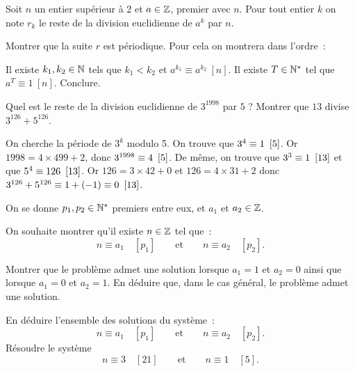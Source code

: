 \documentclass{magnolia}
\begin{document}
Soit $n$ un entier supérieur à 2 et $a\in\mathbb{Z}$, premier avec $n$. Pour tout
entier $k$ on note $r_k$ le reste de la division euclidienne de $a^k$ par $n$.
\begin{questions}
\question Montrer que la suite $r$ est périodique. Pour cela on montrera dans
  l'ordre~:
  \begin{questions}
  \question Il existe $k_1,k_2\in\mathbb{N}$ tels que $k_1<k_2$ et $a^{k_1}\equiv a^{k_2}\ [n]$.
  \question Il existe $T\in{\mathbb{N}^*}$ tel que $a^T\equiv 1\ [n]$.
  \question Conclure.
  \end{questions}
\question Quel est le reste de la division euclidienne de $3^{1998}$ par $5$ ?
\question Montrer que $13$ divise $3^{126}+5^{126}$.
\end{questions}
\begin{sol}
\begin{questions}
\question
\question On cherche la période de $3^k$ modulo 5. On trouve que $3^4\equiv 1\ \cro{5}$. Or $1998=4\times 499+2$, donc $3^{1998}\equiv 4\ \left[5\right]$.
\question De même, on trouve que $3^3\equiv 1\ \cro{13}$ et que $5^4\equiv 126\ \cro{13}$. Or $126=3\times 42+0$ et $126=4\times 31+2$ donc
  $3^{126}+5^{126}\equiv 1+(-1)\equiv 0\ \cro{13}$.
\end{questions}
\end{sol}

On se donne $p_1, p_2\in{\mathbb{N}^*}$ premiers entre eux, et $a_1$ et $a_2\in\mathbb{Z}$. 
\begin{questions}
\question On souhaite montrer qu'il existe $n\in\mathbb{Z}$ tel que~:
  \[n\equiv a_1 \quad [p_1] \qquad \text{et} \qquad n\equiv a_2 \quad [p_2].\]
  \begin{questions}
  \question Montrer que le problème admet une solution lorsque $a_1=1$ et
    $a_2=0$ ainsi que lorsque $a_1=0$ et $a_2=1$.
  \question En déduire que, dans le cas général, le problème admet une solution.
  \end{questions}
\question En déduire l'ensemble des solutions du système~:
  \[n\equiv a_1 \quad [p_1] \qquad \text{et} \qquad n\equiv a_2 \quad [p_2].\]
 Résoudre le système
    \[n\equiv 3 \quad [21] \qquad \text{et} \qquad n\equiv 1 \quad [5].\]
\end{questions}
\end{document}
